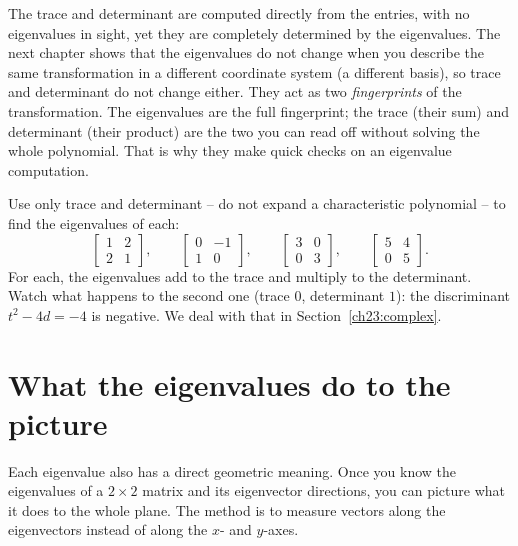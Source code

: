 \begin{aestheticbox}
The trace and determinant are computed directly from the entries, with no
eigenvalues in sight, yet they are completely determined by the eigenvalues. The
next chapter shows that the eigenvalues do not change when you describe the same
transformation in a different coordinate system (a different basis), so trace and
determinant do not change either. They act as two \emph{fingerprints} of the
transformation. The eigenvalues are the full fingerprint; the trace (their sum)
and determinant (their product) are the two you can read off without solving the
whole polynomial. That is why they make quick checks on an eigenvalue computation.
\end{aestheticbox}

\begin{labbox}
Use only trace and determinant -- do not expand a characteristic polynomial -- to
find the eigenvalues of each:
\[
  \begin{bmatrix}1&2\\2&1\end{bmatrix},\qquad
  \begin{bmatrix}0&-1\\1&0\end{bmatrix},\qquad
  \begin{bmatrix}3&0\\0&3\end{bmatrix},\qquad
  \begin{bmatrix}5&4\\0&5\end{bmatrix}.
\]
For each, the eigenvalues add to the trace and multiply to the determinant. Watch
what happens to the second one (trace $0$, determinant $1$): the discriminant
$t^2-4d=-4$ is negative. We deal with that in Section~\ref{ch23:complex}.
\end{labbox}

\section{What the eigenvalues do to the picture}
\label{ch23:geometry}

Each eigenvalue also has a direct geometric meaning. Once you know the eigenvalues
of a $2\times 2$ matrix and its eigenvector directions, you can picture what it
does to the whole plane. The method is to measure vectors along the eigenvectors
instead of along the $x$- and $y$-axes.

